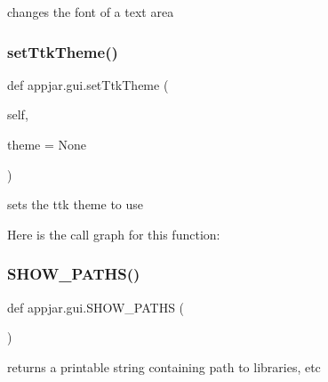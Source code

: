 \begin{DoxyVerb}
\begin{DoxyVerb}changes the font of a text area \end{DoxyVerb}
 \mbox{\label{classappjar_1_1gui_aa1291398af2b803f6b4b6efb2a738f93}} 
\subsubsection{\texorpdfstring{set\+Ttk\+Theme()}{setTtkTheme()}}
{\footnotesize\ttfamily def appjar.\+gui.\+set\+Ttk\+Theme (\begin{DoxyParamCaption}\item[{}]{self,  }\item[{}]{theme = {\ttfamily None} }\end{DoxyParamCaption})}

\begin{DoxyVerb}sets the ttk theme to use \end{DoxyVerb}
 Here is the call graph for this function\+:
\mbox{\label{classappjar_1_1gui_a51486c34591da1e3da5732d2b59467c1}} 
\subsubsection{\texorpdfstring{S\+H\+O\+W\+\_\+\+P\+A\+T\+H\+S()}{SHOW\_PATHS()}}
{\footnotesize\ttfamily def appjar.\+gui.\+S\+H\+O\+W\+\_\+\+P\+A\+T\+HS (\begin{DoxyParamCaption}{ }\end{DoxyParamCaption})\hspace{0.3cm}{\ttfamily [static]}}

\begin{DoxyVerb}returns a printable string containing path to libraries, etc \end{DoxyVerb}
 \mbox{\label{classappjar_1_1gui_aba9d46c077f5d1a77aafbf0721410c54}} 

\end{DoxyVerb}
